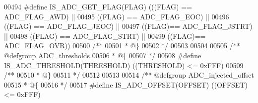 \begin{DoxyCode}
00494 \textcolor{preprocessor}{#}\textcolor{preprocessor}{define} \textcolor{preprocessor}{IS\_ADC\_GET\_FLAG}\textcolor{preprocessor}{(}\textcolor{preprocessor}{FLAG}\textcolor{preprocessor}{)} \textcolor{preprocessor}{(}\textcolor{preprocessor}{(}\textcolor{preprocessor}{(}\textcolor{preprocessor}{FLAG}\textcolor{preprocessor}{)} \textcolor{preprocessor}{==} ADC_FLAG_AWD\textcolor{preprocessor}{)} \textcolor{preprocessor}{||}
00495                                \textcolor{preprocessor}{(}\textcolor{preprocessor}{(}\textcolor{preprocessor}{FLAG}\textcolor{preprocessor}{)} \textcolor{preprocessor}{==} ADC_FLAG_EOC\textcolor{preprocessor}{)} \textcolor{preprocessor}{||}
00496                                \textcolor{preprocessor}{(}\textcolor{preprocessor}{(}\textcolor{preprocessor}{FLAG}\textcolor{preprocessor}{)} \textcolor{preprocessor}{==} ADC_FLAG_JEOC\textcolor{preprocessor}{)} \textcolor{preprocessor}{||}
00497                                \textcolor{preprocessor}{(}\textcolor{preprocessor}{(}\textcolor{preprocessor}{FLAG}\textcolor{preprocessor}{)}\textcolor{preprocessor}{==} ADC_FLAG_JSTRT\textcolor{preprocessor}{)} \textcolor{preprocessor}{||}
00498                                \textcolor{preprocessor}{(}\textcolor{preprocessor}{(}\textcolor{preprocessor}{FLAG}\textcolor{preprocessor}{)} \textcolor{preprocessor}{==} ADC_FLAG_STRT\textcolor{preprocessor}{)} \textcolor{preprocessor}{||}
00499                                \textcolor{preprocessor}{(}\textcolor{preprocessor}{(}\textcolor{preprocessor}{FLAG}\textcolor{preprocessor}{)}\textcolor{preprocessor}{==} ADC_FLAG_OVR\textcolor{preprocessor}{)}\textcolor{preprocessor}{)}
00500 \textcolor{comment}{/**}
00501 \textcolor{comment}{  * @\}}
00502 \textcolor{comment}{  */}
00503 
00504 
00505 \textcolor{comment}{/** @defgroup ADC\_thresholds }
00506 \textcolor{comment}{  * @\{}
00507 \textcolor{comment}{  */}
00508 \textcolor{preprocessor}{#}\textcolor{preprocessor}{define} \textcolor{preprocessor}{IS\_ADC\_THRESHOLD}\textcolor{preprocessor}{(}\textcolor{preprocessor}{THRESHOLD}\textcolor{preprocessor}{)} \textcolor{preprocessor}{(}\textcolor{preprocessor}{(}\textcolor{preprocessor}{THRESHOLD}\textcolor{preprocessor}{)} \textcolor{preprocessor}{<=} 0xFFF\textcolor{preprocessor}{)}
00509 \textcolor{comment}{/**}
00510 \textcolor{comment}{  * @\}}
00511 \textcolor{comment}{  */}
00512 
00513 
00514 \textcolor{comment}{/** @defgroup ADC\_injected\_offset }
00515 \textcolor{comment}{  * @\{}
00516 \textcolor{comment}{  */}
00517 \textcolor{preprocessor}{#}\textcolor{preprocessor}{define} \textcolor{preprocessor}{IS\_ADC\_OFFSET}\textcolor{preprocessor}{(}\textcolor{preprocessor}{OFFSET}\textcolor{preprocessor}{)} \textcolor{preprocessor}{(}\textcolor{preprocessor}{(}\textcolor{preprocessor}{OFFSET}\textcolor{preprocessor}{)} \textcolor{preprocessor}{<=} 0xFFF\textcolor{preprocessor}{)}

\end{DoxyCode}
